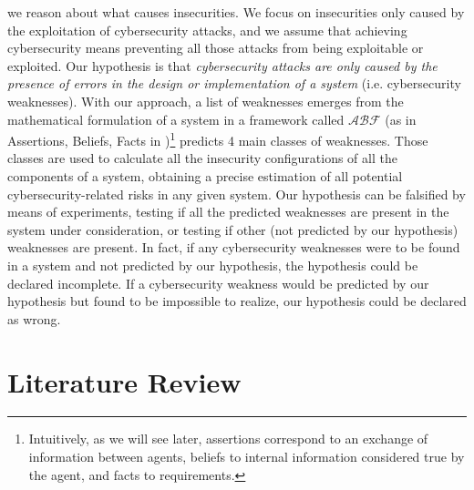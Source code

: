 \documentclass[runningheads]{llncs}
\newcommand{\assertionRegion}{\mathcal{A}}
\newcommand{\beliefRegion}{\mathcal{B}}
\newcommand{\factRegion}{\mathcal{F}}
\newcommand{\abftheory}{\assertionRegion\beliefRegion\factRegion}
\begin{document}
we reason about what causes insecurities. 
We focus on insecurities only caused by
the exploitation of cybersecurity attacks, and we assume that achieving
cybersecurity means preventing all those attacks from being exploitable or
exploited.  Our hypothesis is that \emph{cybersecurity attacks are only caused by the
presence of errors in the design or implementation of a system} (i.e.
cybersecurity weaknesses).
With our approach, a list of weaknesses emerges from the mathematical
formulation of a system in a framework called $\abftheory$ (as in Assertions,
Beliefs, Facts in \autocite{Santaca2016abf})\footnote{Intuitively, as we will
see later, assertions correspond to an exchange of
information between agents, beliefs to internal
information considered true by the agent, and facts to
requirements.} predicts 4 main classes of weaknesses. Those classes are used to
calculate all the insecurity configurations of all the components of a system,
obtaining a precise estimation of all potential cybersecurity-related risks in
any given system. Our hypothesis can be falsified by means of experiments,
testing if all the predicted weaknesses are present in the system under consideration,
or testing if other (not predicted by our hypothesis) weaknesses are present.
In fact, if any cybersecurity weaknesses were to be found in a system and not
predicted by our hypothesis, the hypothesis could be declared incomplete.  If a
cybersecurity weakness would be predicted by our hypothesis but found to be impossible
to realize, our hypothesis could be declared as wrong.

\section{Literature Review}\label{sec:literature}
\end{document}
